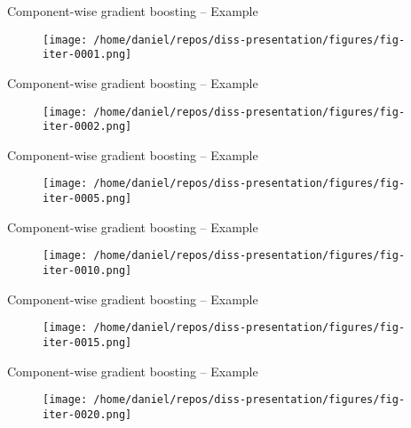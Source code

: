 
\begin{frame}{Component-wise gradient boosting -- Example}
	\begin{figure}
		\centering
		\texttt{[image: /home/daniel/repos/diss-presentation/figures/fig-iter-0001.png]}
	\end{figure}
	\addtocounter{framenumber}{0}
\end{frame}


\begin{frame}{Component-wise gradient boosting -- Example}
	\begin{figure}
		\centering
		\texttt{[image: /home/daniel/repos/diss-presentation/figures/fig-iter-0002.png]}
	\end{figure}
	\addtocounter{framenumber}{-1}
\end{frame}


\begin{frame}{Component-wise gradient boosting -- Example}
	\begin{figure}
		\centering
		\texttt{[image: /home/daniel/repos/diss-presentation/figures/fig-iter-0005.png]}
	\end{figure}
	\addtocounter{framenumber}{-1}
\end{frame}


\begin{frame}{Component-wise gradient boosting -- Example}
	\begin{figure}
		\centering
		\texttt{[image: /home/daniel/repos/diss-presentation/figures/fig-iter-0010.png]}
	\end{figure}
	\addtocounter{framenumber}{-1}
\end{frame}


\begin{frame}{Component-wise gradient boosting -- Example}
	\begin{figure}
		\centering
		\texttt{[image: /home/daniel/repos/diss-presentation/figures/fig-iter-0015.png]}
	\end{figure}
	\addtocounter{framenumber}{-1}
\end{frame}


\begin{frame}{Component-wise gradient boosting -- Example}
	\begin{figure}
		\centering
		\texttt{[image: /home/daniel/repos/diss-presentation/figures/fig-iter-0020.png]}
	\end{figure}
	\addtocounter{framenumber}{-1}
\end{frame}


